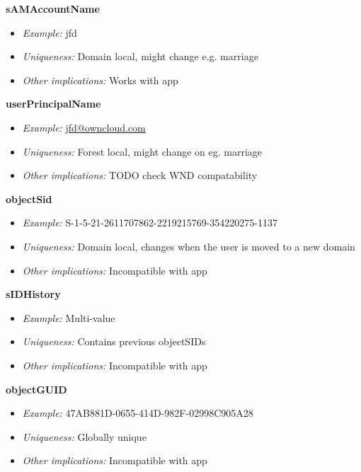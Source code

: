 \documentclass[letterpaper,10pt,english]{sphinxmanual}
\begin{document}
\textbf{sAMAccountName}
\begin{itemize}
\item {} 
\emph{Example:} jfd

\item {} 
\emph{Uniqueness:} Domain local, might change e.g. marriage

\item {} 
\emph{Other implications:} Works with  app

\end{itemize}

\textbf{userPrincipalName}
\begin{itemize}
\item {} 
\emph{Example:} \href{mailto:jfd@owncloud.com}{jfd@owncloud.com}

\item {} 
\emph{Uniqueness:} Forest local, might change on eg. marriage

\item {} 
\emph{Other implications:} TODO check WND compatability

\end{itemize}

\textbf{objectSid}
\begin{itemize}
\item {} 
\emph{Example:} S-1-5-21-2611707862-2219215769-354220275-1137

\item {} 
\emph{Uniqueness:} Domain local, changes when the user is moved to a new domain

\item {} 
\emph{Other implications:} Incompatible with  app

\end{itemize}

\textbf{sIDHistory}
\begin{itemize}
\item {} 
\emph{Example:} Multi-value

\item {} 
\emph{Uniqueness:} Contains previous objectSIDs

\item {} 
\emph{Other implications:} Incompatible with  app

\end{itemize}

\textbf{objectGUID}
\begin{itemize}
\item {} 
\emph{Example:} 47AB881D-0655-414D-982F-02998C905A28

\item {} 
\emph{Uniqueness:} Globally unique

\item {} 
\emph{Other implications:} Incompatible with  app

\end{itemize}
\end{document}
